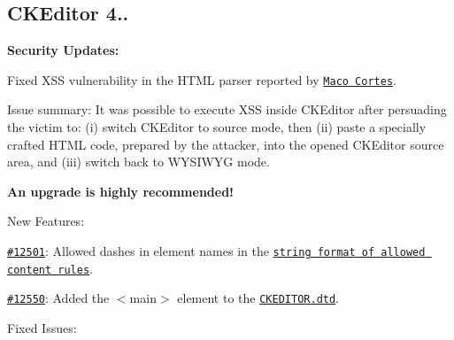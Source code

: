 \subsection*{C\+K\+Editor 4..}

{\bfseries Security Updates\+:}


\begin{DoxyItemize}
\item Fixed X\+SS vulnerability in the H\+T\+ML parser reported by \href{https://www.facebook.com/Maaacoooo}{\tt Maco Cortes}.

Issue summary\+: It was possible to execute X\+SS inside C\+K\+Editor after persuading the victim to\+: (i) switch C\+K\+Editor to source mode, then (ii) paste a specially crafted H\+T\+ML code, prepared by the attacker, into the opened C\+K\+Editor source area, and (iii) switch back to W\+Y\+S\+I\+W\+YG mode.
\end{DoxyItemize}

{\bfseries An upgrade is highly recommended!}

New Features\+:


\begin{DoxyItemize}
\item \href{http://dev.ckeditor.com/ticket/12501}{\tt \#12501}\+: Allowed dashes in element names in the \href{http://docs.ckeditor.com/#!/guide/dev_allowed_content_rules-section-string-format}{\tt string format of allowed content rules}.
\item \href{http://dev.ckeditor.com/ticket/12550}{\tt \#12550}\+: Added the {\ttfamily $<$main$>$} element to the \href{http://docs.ckeditor.com/#!/api/CKEDITOR.dtd}{\tt {\ttfamily C\+K\+E\+D\+I\+T\+O\+R.\+dtd}}.
\end{DoxyItemize}

Fixed Issues\+:


